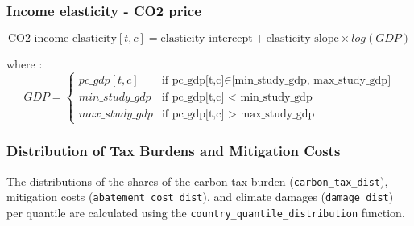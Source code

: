 \documentclass[
]{article}
\begin{document}
\subsubsection{Income elasticity - CO2
price}\label{income-elasticity---co2-price}

\begin{equation}
  \text{CO2\_income\_elasticity}[t,c] = \text{elasticity\_intercept} + \text{elasticity\_slope} \times log(GDP)
\end{equation}


where : 
\begin{equation}
 GDP = 
 \begin{cases}
 pc\_gdp[t,c] & \text{if  pc\_gdp[t,c]} \in \text{[min\_study\_gdp, max\_study\_gdp]} \\
 min\_study\_gdp & \text{if  pc\_gdp[t,c] < min\_study\_gdp} \\
 max\_study\_gdp & \text{if  pc\_gdp[t,c] > max\_study\_gdp}
 \end{cases} 
\end{equation}


\subsubsection{Distribution of Tax Burdens and Mitigation
Costs}\label{distribution-of-tax-burdens-and-mitigation-costs}

The distributions of the shares of the carbon tax burden
(\texttt{carbon\_tax\_dist}), mitigation costs
(\texttt{abatement\_cost\_dist}), and climate damages
(\texttt{damage\_dist}) per quantile are calculated using the
\texttt{country\_quantile\_distribution} function.
\end{document}
